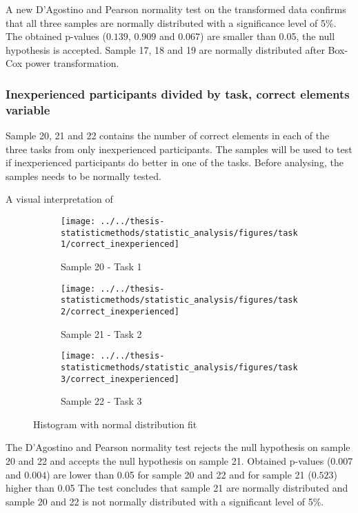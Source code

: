 A new D'Agostino and Pearson normality test on the transformed data confirms that all three samples are normally distributed with a significance level of 5\%. The obtained p-values ($0.139$, $0.909$ and $0.067$) are smaller than 0.05, the null hypothesis is accepted. Sample 17, 18 and 19 are normally distributed after Box-Cox power transformation. \\[0.2cm]

\subsubsection[Sample 20, 21 and 22]{Inexperienced participants  divided by task, correct elements variable}\label{sec:sample_20,21,22_normalitytest}
Sample 20, 21 and 22 contains the number of correct elements in each of the three tasks from only inexperienced participants. The samples will be used to test if inexperienced participants do better in one of the tasks. Before analysing, the samples needs to be normally tested. 

A visual interpretation of 

\begin{figure}[H]
	\centering
	\begin{subfigure}[b]{0.32\textwidth}
		\centering
		\texttt{[image: ../../thesis-statisticmethods/statistic\_analysis/figures/task1/correct\_inexperienced]}
		\caption{Sample 20 - Task 1}
		\label{fig:correctinexperienced_task1}
	\end{subfigure}
	\begin{subfigure}[b]{0.32\textwidth}
		\centering
		\texttt{[image: ../../thesis-statisticmethods/statistic\_analysis/figures/task2/correct\_inexperienced]}
		\caption{Sample 21 - Task 2}
		\label{fig:correctinexperienced_task2}
	\end{subfigure}
	\begin{subfigure}[b]{0.32\textwidth}
		\centering
		\texttt{[image: ../../thesis-statisticmethods/statistic\_analysis/figures/task3/correct\_inexperienced]}
		\caption{Sample 22 - Task 3}
		\label{fig:correctinexperienced_task3}
	\end{subfigure}
	\caption{Histogram with normal distribution fit}
\end{figure}

The D'Agostino and Pearson normality test rejects the null hypothesis on sample 20 and 22 and accepts the null hypothesis on sample 21. Obtained p-values ($0.007$ and $0.004$) are lower than 0.05 for sample 20 and 22 and for sample 21 ($0.523$) higher than 0.05 The test concludes that sample 21 are normally distributed and sample 20 and 22 is not normally distributed with a significant level of 5\%. \newline

